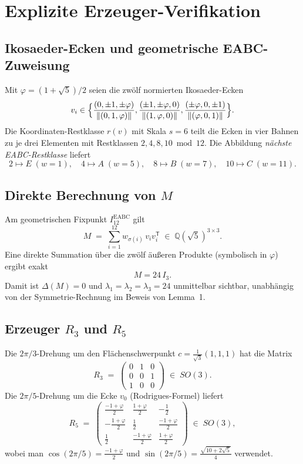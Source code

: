\documentclass[11pt,a4paper]{article}
\newcommand{\Q}{\mathbb{Q}}
\begin{document}
	\appendix
	\section{Explizite Erzeuger-Verifikation}
	\label{app:generators}
	
	\subsection{Ikosaeder-Ecken und geometrische EABC-Zuweisung}
	
	Mit $\varphi=(1+\sqrt5)/2$ seien die zwölf normierten Ikosaeder-Ecken
	\[
	v_i \in
	\Bigl\{
	\frac{(0,\pm1,\pm\varphi)}{\|(0,1,\varphi)\|},
	\frac{(\pm1,\pm\varphi,0)}{\|(1,\varphi,0)\|},
	\frac{(\pm\varphi,0,\pm1)}{\|(\varphi,0,1)\|}
	\Bigr\}.
	\]
	Die Koordinaten-Restklasse $r(v)$ mit Skala $s=6$ teilt die Ecken in vier
	Bahnen zu je drei Elementen mit Restklassen $2,4,8,10\bmod 12$.
	Die Abbildung \emph{nächste EABC-Restklasse} liefert
	\[
	2\mapsto E\;(w=1),\quad
	4\mapsto A\;(w=5),\quad
	8\mapsto B\;(w=7),\quad
	10\mapsto C\;(w=11).
	\]
	
	\subsection{Direkte Berechnung von $M$}
	
	Am geometrischen Fixpunkt $I_{12}^{\mathrm{EABC}}$ gilt
	\[
	M
	\;=\;
	\sum_{i=1}^{12} w_{\sigma(i)}\, v_i v_i^{\mathsf T}
	\;\in\;
	\Q(\sqrt5)^{3\times 3}.
	\]
	Eine direkte Summation über die zwölf äußeren Produkte (symbolisch in
	$\varphi$) ergibt exakt
	\[
	M = 24\,I_3.
	\]
	Damit ist $\Delta(M)=0$ und $\lambda_1=\lambda_2=\lambda_3=24$ unmittelbar
	sichtbar, unabhängig von der Symmetrie-Rechnung im Beweis von Lemma~1.
	
	\subsection{Erzeuger $R_3$ und $R_5$}
	
	Die $2\pi/3$-Drehung um den Flächenschwerpunkt $c=\tfrac{1}{\sqrt3}(1,1,1)$
	hat die Matrix
	\[
	R_3
	\;=\;
	\begin{pmatrix}
		0&1&0\\ 0&0&1\\ 1&0&0
	\end{pmatrix}
	\;\in\; SO(3).
	\]
	Die $2\pi/5$-Drehung um die Ecke $v_0$ (Rodrigues-Formel) liefert
	\[
	R_5
	\;=\;
	\begin{pmatrix}
		\tfrac{-1+\varphi}{2} & \tfrac{1+\varphi}{2} & -\tfrac12 \\[4pt]
		-\tfrac{1+\varphi}{2} & \tfrac12 & \tfrac{-1+\varphi}{2} \\[4pt]
		\tfrac12 & \tfrac{-1+\varphi}{2} & \tfrac{1+\varphi}{2}
	\end{pmatrix}
	\;\in\; SO(3),
	\]
	wobei man $\cos(2\pi/5)=\tfrac{-1+\varphi}{2}$ und
	$\sin(2\pi/5)=\tfrac{\sqrt{10+2\sqrt5}}{4}$ verwendet.
	
\end{document}

